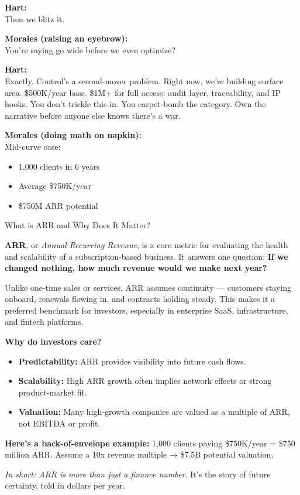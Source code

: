 \textbf{Hart:} \\
Then we blitz it.

\textbf{Morales (raising an eyebrow):} \\
You’re saying go wide before we even optimize?

\textbf{Hart:} \\
Exactly. Control’s a second-mover problem. Right now, we’re building surface area.  
\$500K/year base. \$1M+ for full access: audit layer, traceability, and IP hooks.  
You don’t trickle this in. You carpet-bomb the category. Own the narrative before anyone else knows there’s a war.

\textbf{Morales (doing math on napkin):} \\
Mid-curve case:
\begin{itemize}
  \item 1,000 clients in 6 years  
  \item Average \$750K/year  
  \item \$750M ARR potential
\end{itemize}

\medskip

\begin{TechnicalSidebar}{What is ARR and Why Does It Matter?}

  \textbf{ARR}, or \textit{Annual Recurring Revenue}, is a core metric for evaluating the health and scalability of 
  a subscription-based business.  
  It answers one question: \textbf{If we changed nothing, how much revenue would we make next year?}
  
  \medskip
  
  Unlike one-time sales or services, ARR assumes continuity — customers staying onboard, renewals flowing in, and 
  contracts holding steady.  
  This makes it a preferred benchmark for investors, especially in enterprise SaaS, infrastructure, and 
  fintech platforms.
  
  \medskip
  
  \textbf{Why do investors care?}

  \medskip
  
  \begin{itemize}
    \item \textbf{Predictability:} ARR provides visibility into future cash flows.
    \item \textbf{Scalability:} High ARR growth often implies network effects or strong product-market fit.
    \item \textbf{Valuation:} Many high-growth companies are valued as a multiple of ARR, not EBITDA or profit.
  \end{itemize}
  
  \medskip
  
  \textbf{Here's a back-of-envelope example:}  
  1,000 clients paying \$750K/year = \$750 million ARR.  
  Assume a 10x revenue multiple → \$7.5B potential valuation.
  
  \medskip
  
  \textit{In short: ARR is more than just a finance number.}  
  It’s the story of future certainty, told in dollars per year.
  
\end{TechnicalSidebar}

